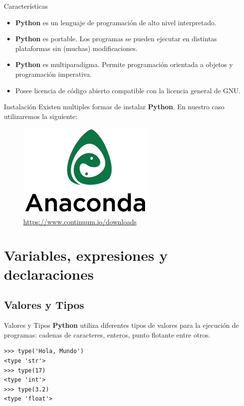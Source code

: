 \documentclass[11pt]{beamer}
\begin{document}
\begin{frame}{Características}
\begin{itemize}
\item \textbf{Python} es un lenguaje de programación de alto nivel interpretado.
\pause
\item \textbf{Python} es portable. Los programas se pueden ejecutar en distintas plataformas sin (muchas) modificaciones.
\pause
\item \textbf{Python} es multiparadigma. Permite programación orientada a objetos y programación imperativa.
\pause
\item Posee licencia de código abierto compatible con la licencia general de GNU.
\end{itemize}
\end{frame}

\begin{frame}{Instalación}
Existen multiples formas de instalar \textbf{Python}. En nuestro caso utilizaremos la siguiente:
\begin{center}
\begin{figure}
\includegraphics[scale=0.5]{anaconda.png}\\
\url{https://www.continuum.io/downloads}
\end{figure}
\end{center}
\end{frame}


\section{Variables, expresiones y declaraciones}

\subsection{Valores y Tipos}
\begin{frame}[fragile]{Valores y Tipos}
\textbf{Python} utiliza diferentes tipos de valores para la ejecución de programas: cadenas de caracteres, enteros, punto flotante entre otros.
\begin{verbatim}
>>> type('Hola, Mundo')
<type 'str'>
>>> type(17)
<type 'int'>
>>> type(3.2)
<type 'float'>
\end{verbatim}
\end{frame}
\end{document}
